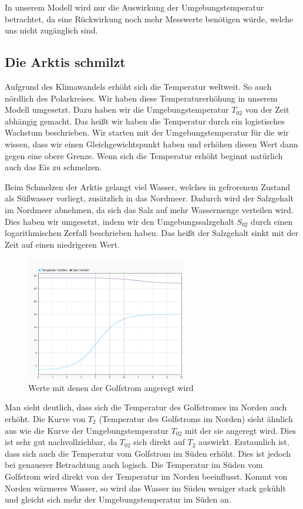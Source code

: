 \documentclass[a4paper,twoside]{article}
\begin{document}
	In unserem Modell wird nur die Auswirkung der Umgebungstemperatur betrachtet, da eine Rückwirkung noch mehr Messwerte benötigen würde, welche uns nicht zugänglich sind.  
	

	\subsection{Die Arktis schmilzt} \label{dieArktisSchmilzt}
	
	Aufgrund des Klimawandels erhöht sich die Temperatur weltweit. So auch nördlich des Polarkreises. Wir haben diese Temperaturerhöhung in unserem Modell umgesetzt. Dazu haben wir die Umgebungstemperatur \(T_{02}\) von der Zeit abhängig gemacht. Das heißt wir haben die Temperatur durch ein logistisches Wachstum beschrieben. Wir starten mit der Umgebungstemperatur für die wir wissen, dass wir einen Gleichgewichtspunkt haben und erhöhen diesen Wert dann gegen eine obere Grenze. Wenn sich die Temperatur erhöht beginnt natürlich auch das Eis zu schmelzen.
		
	Beim Schmelzen der Arktis gelangt viel Wasser, welches in gefrorenem Zustand als Süßwasser vorliegt, zusätzlich in das Nordmeer. Dadurch wird der Salzgehalt im Nordmeer abnehmen, da sich das Salz auf mehr Wassermenge verteilen wird. Dies haben wir umgesetzt, indem wir den Umgebungssalzgehalt \(S_{02}\) durch einen logarithmischen Zerfall beschrieben haben. Das heißt der Salzgehalt sinkt mit der Zeit auf einen niedrigeren Wert. 
	
	\begin{figure}[!h]
  		\centering
 		\includegraphics[width=7cm]{Grafiken/Arktis_schmilzt_init.png}
  		\caption{Werte mit denen der Golfstrom angeregt wird}
  		\label{fig:schmilztUmgebung}
	\end{figure}

	Man sieht deutlich, dass sich die Temperatur des Golfstromes im Norden auch erhöht. Die Kurve von \(T_2\) (Temperatur des Golfstroms im Norden) sieht ähnlich aus wie die Kurve der Umgebungstemperatur \(T_{02}\) mit der sie angeregt wird. Dies ist sehr gut nachvollziehbar, da \(T_{02}\) sich direkt auf \(T_2\) auswirkt. Erstaunlich ist, dass sich auch die Temperatur vom Golfstrom im Süden erhöht. Dies ist jedoch bei genauerer Betrachtung auch logisch. Die Temperatur im Süden vom Golfstrom wird direkt von der Temperatur im Norden beeinflusst. Kommt von Norden wärmeres Wasser, so wird das Wasser im Süden weniger stark gekühlt und gleicht sich mehr der Umgebungstemperatur im Süden an.
	
\end{document}
